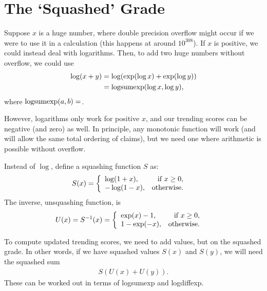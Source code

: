 \documentclass[a4paper, 12pt]{article}
\newcommand{\logsumexp}{\textnormal{logsumexp}}
\begin{document}
\section{The `Squashed' Grade}
Suppose $x$ is a huge number, where double precision overflow might occur if
we were to use it in a calculation (this happens at around $10^{308}$).
If $x$ is positive, we could instead deal with logarithms. Then, to add
two huge numbers without overflow, we could use
\begin{align}
\log(x + y)  &= \log(\exp(\log x) + \exp(\log y)) \\
             &= \logsumexp(\log x, \log y),
\end{align}
where $\logsumexp(a, b) = $.

However,
logarithms only work for positive $x$, and our trending scores can be
negative (and zero) as well. In principle, any monotonic function will work
(and will allow the same total ordering of claims),
but we need one where arithmetic is possible without overflow.

Instead of $\log$, define a squashing function $S$ as:
\begin{align}
S(x) &=
    \left\{
        \begin{array}{lr}
            \log (1 + x), & \textnormal{if } x \geq 0, \\
            -\log(1 - x), & \textnormal{otherwise}.
        \end{array}
    \right.
\end{align}
The inverse, unsquashing function, is
\begin{align}
U(x) = S^{-1}(x) &=
    \left\{
        \begin{array}{lr}
            \exp(x) - 1,  & \textnormal{if } x \geq 0, \\
            1 - \exp(-x), & \textnormal{otherwise}.
        \end{array}
    \right.
\end{align}

To compute updated trending scores, we need to add values, but on the
squashed grade. In other words, if we have squashed values $S(x)$ and
$S(y)$, we will need the squashed sum
\begin{align}
S(U(x) + U(y)).
\end{align}
These can be worked out in terms of logsumexp and logdiffexp.
\end{document}

